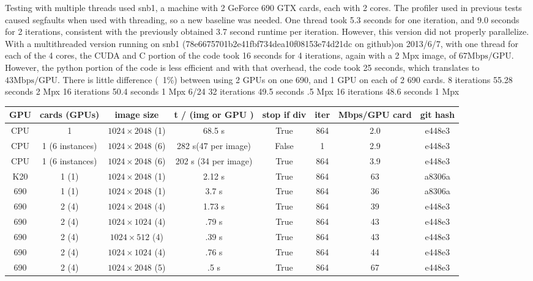 \documentclass[11pt]{article}
\begin{document}
	Testing with multiple threads used snb1, a machine with 2 GeForce 690 GTX cards, each with 2 cores. The profiler used in previous tests caused segfaults when used with threading, so a new baseline was needed.  One thread took 5.3 seconds for one iteration, and 9.0 seconds for 2 iterations, consistent with the previously obtained 3.7 second runtime per iteration.  However, this version did not properly parallelize.
	With a multithreaded version running on snb1 (78e6675701b2e41fbf734dea10f08153e74d21dc on github)on 2013/6/7, with one thread for each of the 4 cores, the CUDA and C portion of the code took 16 seconds for 4 iterations, again with a 2 Mpx image, of $67 \mathrm{Mbps/GPU}$.  However, the python portion of the code is less efficient and with that overhead, the code took 25 seconds, which translates to $43 \mathrm{Mbps/GPU}$.  There is little difference (~1\%) between using 2 GPUs on one 690, and 1 GPU on each of 2 690 cards.
	8 iterations 55.28 seconds 2 Mpx
	16 iterations 50.4 seconds 1 Mpx
	6/24
	32 iterations 49.5 seconds .5 Mpx
	16 iterations 48.6 seconds 1 Mpx
	
	\begin{tabular}{c|c|c|c|c|c|c|c}
	GPU & cards (GPUs) & image size & t / (img or GPU ) & stop if div & iter & Mbps/GPU card & git hash \\
	\hline
	CPU & 1	& $1024 \times 2048$ (1)& 68.5 s& True & 864 & 2.0 & e448e3\\
	CPU & 1 (6 instances) & $1024 \times 2048$ (6)& 282 s(47 per image) & False & 1 & 2.9 & e448e3\\
	
	CPU & 1 (6 instances) & $1024 \times 2048$ (6)& 202 s (34 per image) & True & 864 & 3.9 & e448e3\\
	K20 & 1 (1) & $1024 \times 2048$ (1)& 2.12 s & True & 864 &  63 & a8306a\\
	690 & 1 (1) & $1024 \times 2048$ (1)& 3.7 s & True & 864 &  36 & a8306a\\
	690 & 2 (4) & $1024 \times 2048$ (4) & 1.73 s & True & 864 & 39 & e448e3\\
	690 & 2 (4) & $1024 \times 1024$ (4)& .79 s & True & 864 & 43 & e448e3\\
	690 & 2 (4) & $1024 \times 512$ (4)& .39 s & True & 864 & 43 & e448e3\\
	690 & 2 (4) & $1024 \times 1024$ (4)& .76 s & True & 864 & 44 & e448e3\\
	690 & 2 (4) & $1024 \times 2048$ (5)& .5 s & True & 864 & 67 & e448e3
	\end{tabular}
\end{document}
